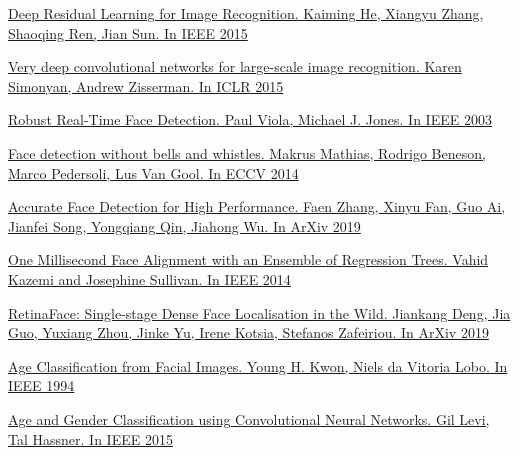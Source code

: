 \begin{thebibliography}{0}

    \hypertarget{resnet}{}
    \href{https://arxiv.org/abs/1512.03385}
    {
        Deep Residual Learning for Image Recognition.
        Kaiming He, Xiangyu Zhang, Shaoqing Ren, Jian Sun.
        In IEEE 2015
    }

    \hypertarget{vgg}{}
    \href{https://arxiv.org/pdf/1409.1556.pdf}
    {
        Very deep convolutional networks for large-scale image recognition.
        Karen Simonyan, Andrew Zisserman.
        In ICLR 2015
    }

    \hypertarget{face_detection}{}
    \href{http://www.face-rec.org/algorithms/Boosting-Ensemble/16981346.pdf}
    {
        Robust Real-Time Face Detection.
        Paul Viola, Michael J. Jones.
        In IEEE 2003
    }

    \hypertarget{face_detection2}{}
    \href{http://rodrigob.github.io/documents/2014_eccv_face_detection_with_supplementary_material.pdf}
    {
        Face detection without bells and whistles.
        Makrus Mathias, Rodrigo Beneson, Marco Pedersoli, Lus Van Gool.
        In ECCV 2014
    }

    \hypertarget{face_detection3}{}
    \href{https://arxiv.org/abs/1905.01585}
    {
        Accurate Face Detection for High Performance.
        Faen Zhang, Xinyu Fan, Guo Ai, Jianfei Song, Yongqiang Qin, Jiahong Wu.
        In ArXiv 2019
    }

    \hypertarget{align}{}
    \href{http://www.csc.kth.se/~vahidk/papers/KazemiCVPR14.pdf}
    {
        One Millisecond Face Alignment with an Ensemble of Regression Trees.
        Vahid Kazemi and Josephine Sullivan.
        In IEEE 2014
    }

    \hypertarget{retinaface}{}
    \href{https://arxiv.org/abs/1905.00641}
    {
        RetinaFace: Single-stage Dense Face Localisation in the Wild.
        Jiankang Deng, Jia Guo, Yuxiang Zhou, Jinke Yu, Irene Kotsia, Stefanos Zafeiriou.
        In ArXiv 2019
    }

    \hypertarget{age1994}{}
    \href{https://pdfs.semanticscholar.org/20cb/d360c8e6f70aac3e11853d81e3b18e4866c2.pdf}
    {
        Age Classification from Facial Images.
        Young H. Kwon, Niels da Vitoria Lobo.
        In IEEE 1994
    }


    \hypertarget{hassner}{}
    \href{https://talhassner.github.io/home/projects/cnn_agegender/CVPR2015_CNN_AgeGenderEstimation.pdf}
    {
        Age and Gender Classification using Convolutional Neural Networks.
        Gil Levi, Tal Hassner.
        In IEEE 2015
    }


\end{thebibliography}
